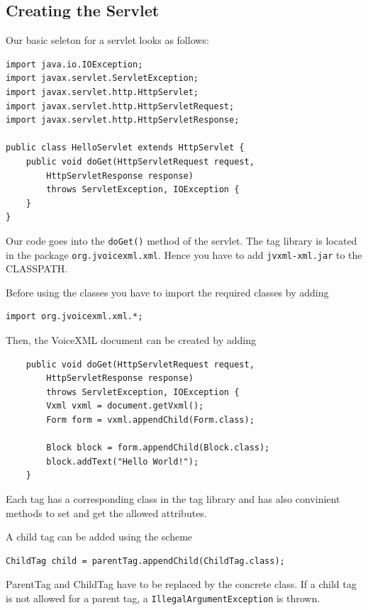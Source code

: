 \documentclass[11pt,a4paper]{article}
\begin{document}
\subsection{Creating the Servlet}

Our basic seleton for a servlet looks as follows:

\begin{lstlisting}
import java.io.IOException;
import javax.servlet.ServletException;
import javax.servlet.http.HttpServlet;
import javax.servlet.http.HttpServletRequest;
import javax.servlet.http.HttpServletResponse;

public class HelloServlet extends HttpServlet {
    public void doGet(HttpServletRequest request,
        HttpServletResponse response)
        throws ServletException, IOException {
    }
}
\end{lstlisting}

Our code goes into the \texttt{doGet()} method of the servlet. The tag library
is located in the package \texttt{org.jvoicexml.xml}. Hence you have to add
\texttt{jvxml-xml.jar} to the CLASSPATH.

Before using the classes you have to import the required classes by adding
\begin{lstlisting}
import org.jvoicexml.xml.*;
\end{lstlisting}

Then, the VoiceXML document can be created by adding
\begin{lstlisting}
    public void doGet(HttpServletRequest request,
        HttpServletResponse response)
        throws ServletException, IOException {
        Vxml vxml = document.getVxml();
        Form form = vxml.appendChild(Form.class);

        Block block = form.appendChild(Block.class);
        block.addText("Hello World!");
    }
\end{lstlisting}

Each tag has a corresponding class in the tag library and has also convinient
methods to set and get the allowed attributes.

A child tag can be added using the scheme
\begin{lstlisting}
ChildTag child = parentTag.appendChild(ChildTag.class);
\end{lstlisting}

ParentTag and ChildTag have to be replaced by the concrete class. If a child
tag is not allowed for a parent tag, a \texttt{IllegalArgumentException} is
thrown.
\end{document}
